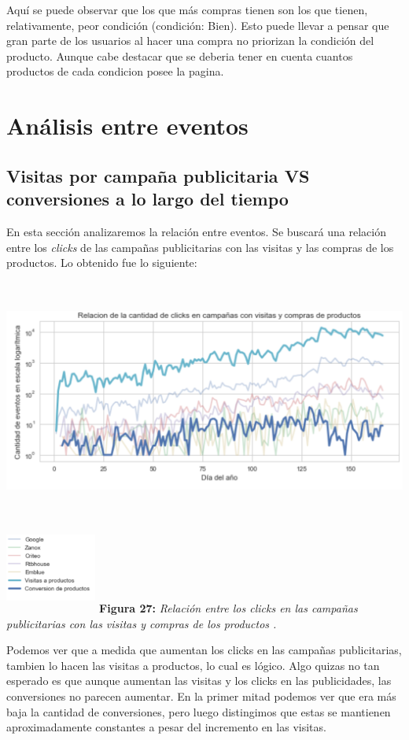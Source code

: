 \documentclass[titlepage,a4paper]{article}
\begin{document}
	  Aquí se puede observar que los que más compras tienen son los que tienen, relativamente, peor condición (condición: Bien). Esto puede llevar a pensar que gran parte de los usuarios al hacer una compra no priorizan la condición del producto. Aunque cabe destacar que se deberia tener en cuenta cuantos productos de cada condicion posee la pagina.
	  
	
	\section{Análisis entre eventos}
	\subsection{Visitas por campaña publicitaria VS conversiones a lo largo del tiempo}
	En esta sección analizaremos la relación entre eventos. 
	Se buscará una relación entre los \textit{clicks} de las campañas publicitarias con las visitas y las compras de los productos. 	Lo obtenido fue lo siguiente:
	\begin{center}
	\includegraphics[width=15cm,height = 8cm] {RelacionCampaniaYConversion.jpg}\\
	\includegraphics[width = 3cm, height = 3cm]{RelacionCampaniaYConversionCuadrito}
	\textbf{Figura 27:}  \textit{ Relación entre los clicks en las campañas publicitarias con las visitas y compras de los productos .}
	\end{center}
	Podemos ver que a medida que aumentan los clicks en las campañas publicitarias, tambien
lo hacen las visitas a productos, lo cual es lógico. Algo quizas no tan esperado es que aunque aumentan
las visitas y los clicks en las publicidades, las conversiones no parecen aumentar. En la primer mitad podemos
ver que era más baja la cantidad de conversiones, pero luego distingimos que estas se mantienen aproximadamente 
constantes a pesar del incremento en las visitas.
\end{document}
